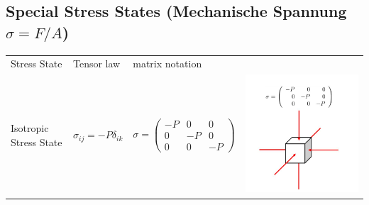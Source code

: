 \subsection{Special Stress States (Mechanische Spannung $\sigma = F/A$)}
	\begin{tabularx}{\columnwidth}{llXX}
		Stress State & Tensor law & matrix notation & \\ 
		Isotropic Stress State & $\sigma_{ij} = -P\delta_{ik}$&	$ \sigma = \begin{pmatrix} -P & 0 & 0\\ 0 & -P & 0\\ 0 & 0 & -P \end{pmatrix}$ &\vspace*{-1.5cm}\includegraphics[scale=.2]{images/3Dcfisotropic}\\

\end{tabularx}
